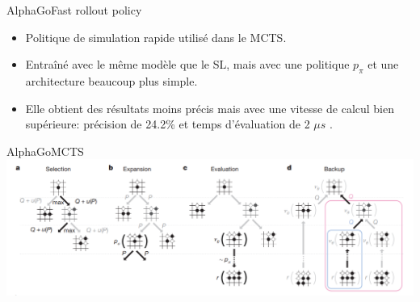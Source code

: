 \begin{frame}{AlphaGo}{Fast rollout policy}
    \begin{itemize}
        \item Politique de simulation rapide utilisé dans le MCTS.
        \item Entraîné avec le même modèle que le SL, mais avec une politique $p_\pi$ et une architecture beaucoup plus simple.
        \item Elle obtient des résultats moins précis mais avec une vitesse de calcul bien supérieure: précision de 24.2\% et temps d'évaluation de 2 $\mu s$ .
    \end{itemize}
\end{frame}


\begin{frame}{AlphaGo}{MCTS}
    \includegraphics*[scale = 0.5]{ressources/AlphaGo/MCTS_AlphaGo}
\end{frame}

